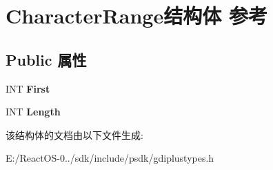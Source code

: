 \hypertarget{struct_character_range}{}\section{Character\+Range结构体 参考}
\label{struct_character_range}
\subsection*{Public 属性}
\begin{DoxyCompactItemize}
\item 
\mbox{\label{struct_character_range_a1ce66ad7d046f29fd515e46a7b47bc63}} 
I\+NT {\bfseries First}
\item 
\mbox{\label{struct_character_range_a3a3d2d58a049de618399d698c40ee3f4}} 
I\+NT {\bfseries Length}
\end{DoxyCompactItemize}


该结构体的文档由以下文件生成\+:\begin{DoxyCompactItemize}
\item 
E\+:/\+React\+O\+S-\/0../sdk/include/psdk/gdiplustypes.\+h\end{DoxyCompactItemize}
